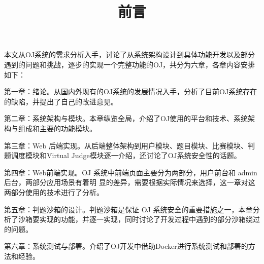 \begin{center}
\title{前言}
\date{}
\maketitle
\end{center}

本文从OJ系统的需求分析入手，讨论了从系统架构设计到具体功能开发以及部分遇到的问题和挑战，逐步的实现一个完整功能的OJ，共分为六章，各章内容安排如下：

第一章：绪论。从国内外现有的OJ系统的发展情况入手，分析了目前OJ系统存在的缺陷，并提出了自己的改进意见。

第二章：系统架构与模块。本章纵览全局，介绍了OJ使用的平台和技术、系统架构与组成和主要的功能模块。

第三章：Web 后端实现。从后端整体架构到用户模块、题目模块、比赛模块、判题调度模块和Virtual Judge模块逐一介绍，还讨论了OJ系统安全性的话题。

第四章：Web前端实现。OJ 系统中前端页面主要分为两部分，用户前台和 admin 后台，两部分应用场景有着明
显的差异，需要根据实际情况来选择，这一章对这两部分使用的技术进行了分析。

第五章：判题沙箱的设计。判题沙箱是保证 OJ 系统安全的重要措施之一，本章分析了沙箱要实现的功能，并逐一实现，同时讨论了开发过程中遇到的部分沙箱绕过的问题。

第六章：系统测试与部署。介绍了OJ开发中借助Docker进行系统测试和部署的方法和经验。

